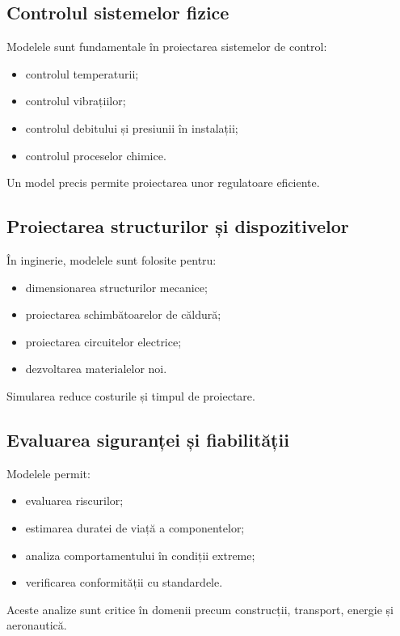 \documentclass[12pt,a4paper]{article}
\begin{document}
\subsection*{Controlul sistemelor fizice}

Modelele sunt fundamentale în proiectarea sistemelor de control:
\begin{itemize}
    \item controlul temperaturii;
    \item controlul vibrațiilor;
    \item controlul debitului și presiunii în instalații;
    \item controlul proceselor chimice.
\end{itemize}

Un model precis permite proiectarea unor regulatoare eficiente.

\subsection*{Proiectarea structurilor și dispozitivelor}

În inginerie, modelele sunt folosite pentru:
\begin{itemize}
    \item dimensionarea structurilor mecanice;
    \item proiectarea schimbătoarelor de căldură;
    \item proiectarea circuitelor electrice;
    \item dezvoltarea materialelor noi.
\end{itemize}

Simularea reduce costurile și timpul de proiectare.

\subsection*{Evaluarea siguranței și fiabilității}

Modelele permit:
\begin{itemize}
    \item evaluarea riscurilor;
    \item estimarea duratei de viață a componentelor;
    \item analiza comportamentului în condiții extreme;
    \item verificarea conformității cu standardele.
\end{itemize}

Aceste analize sunt critice în domenii precum construcții, transport, energie și aeronautică.
\end{document}
